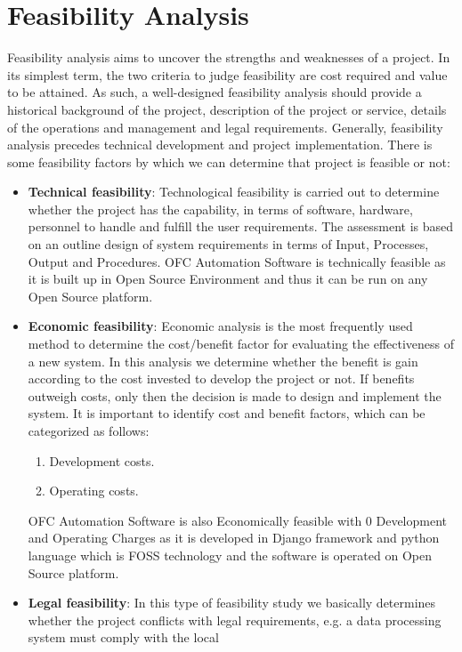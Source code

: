 \section{Feasibility Analysis}
Feasibility analysis aims to uncover the strengths and weaknesses of 
a project. In its simplest term, the two criteria to judge feasibility 
are cost required and value to be attained. As such, a well-designed 
feasibility analysis should provide a historical background of the 
project, description of the project or service, details of the 
operations and management and legal requirements. Generally, feasibility 
analysis precedes technical development and project implementation. 
There is some feasibility factors by which we can determine that 
project is feasible or not:
\begin{itemize}
\item {\bf{Technical feasibility}}: Technological feasibility is carried 
out to determine whether the project has the capability, in terms of 
software, hardware, personnel to handle and fulfill the user 
requirements. The assessment is based on an outline design of system 
requirements in terms of Input, Processes, Output and Procedures. OFC 
Automation Software is technically feasible as it is built up in Open 
Source Environment and thus it can be run on any Open Source platform.
\item {\bf{Economic feasibility}}: Economic analysis is the most 
frequently used method to determine the cost/benefit factor for 
evaluating the effectiveness of a new system. In this analysis we 
determine whether the benefit is gain according to the cost invested 
to develop the project or not. If benefits outweigh costs, only then 
the decision is made to design and implement the system. It is 
important to identify cost and benefit factors, which can be categorized 
as follows:
\begin{enumerate}
\item Development costs.
\item Operating costs.
\end{enumerate}
OFC Automation Software is also Economically feasible with 0 Development 
and Operating Charges as it is developed in Django framework and python 
language which is FOSS technology and the software is operated on Open 
Source platform.
\item {\bf {Legal feasibility}}: In this type of feasibility study we 
basically determines whether the project conflicts with legal 
requirements, e.g. a data processing system must comply with the local 

\end{itemize}
